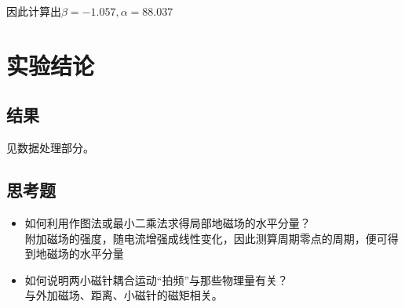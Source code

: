 \documentclass[a4paper]{ltxdoc}
\begin{document}
\begin{multicols}{2}
    因此计算出$\beta = -1.057, \alpha = 88.037$

    \section{实验结论}
    \subsection{结果}
    见数据处理部分。
    \subsection{思考题}
    \begin{itemize}
        \item 如何利用作图法或最小二乘法求得局部地磁场的水平分量？\\附加磁场的强度，随电流增强成线性变化，因此测算周期零点的周期，便可得到地磁场的水平分量
        \item 如何说明两小磁针耦合运动“拍频”与那些物理量有关？\\与外加磁场、距离、小磁针的磁矩相关。
    \end{itemize}
\end{multicols}
\end{document}
